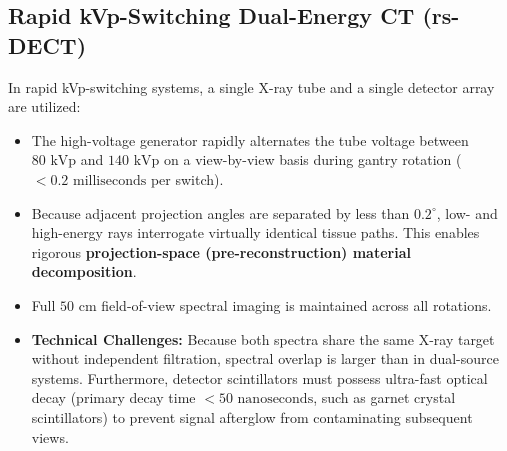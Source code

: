 \documentclass[11pt,a4paper]{article}
\begin{document}
\subsection{Rapid kVp-Switching Dual-Energy CT (rs-DECT)}
In rapid kVp-switching systems, a single X-ray tube and a single detector array are utilized:
\begin{itemize}[leftmargin=2em]
    \item The high-voltage generator rapidly alternates the tube voltage between $80\text{ kVp}$ and $140\text{ kVp}$ on a view-by-view basis during gantry rotation ($< 0.2\text{ milliseconds}$ per switch).
    \item Because adjacent projection angles are separated by less than $0.2^\circ$, low- and high-energy rays interrogate virtually identical tissue paths. This enables rigorous \textbf{projection-space (pre-reconstruction) material decomposition}.
    \item Full $50\text{ cm}$ field-of-view spectral imaging is maintained across all rotations.
    \item \textbf{Technical Challenges:} Because both spectra share the same X-ray target without independent filtration, spectral overlap is larger than in dual-source systems. Furthermore, detector scintillators must possess ultra-fast optical decay (primary decay time $< 50\text{ nanoseconds}$, such as garnet crystal scintillators) to prevent signal afterglow from contaminating subsequent views.
\end{itemize}
\end{document}
